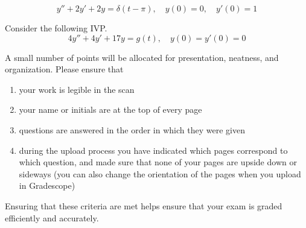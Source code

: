 \documentclass[12pt]{exam}
\begin{document}
\begin{questions}
    $$ y''+ 2y'+2y =  \delta(t - \pi), \quad y(0) = 0, \quad y'(0) = 1$$ %
        
    \newpage \Initials
    
    \question[10] %
    Consider the following IVP. 
    $$4y''+4y'+17y=g(t), \quad y(0) = y'(0) = 0$$
    
    
    \newpage \Initials
    
    \question[2] A small number of points will be allocated for presentation, neatness, and organization. Please ensure that
    \begin{enumerate}
        \item your work is legible in the scan
        \item your name or initials are at the top of every page
        \item questions are answered in the order in which they were given
        \item during the upload process you have indicated which pages correspond to which question, and made sure that none of your pages are upside down or sideways (you can also change the orientation of the pages when you upload in Gradescope)
    \end{enumerate}
    Ensuring that these criteria are met helps ensure that your exam is graded efficiently and accurately. 
    


    
\end{questions}
    
\end{document}

